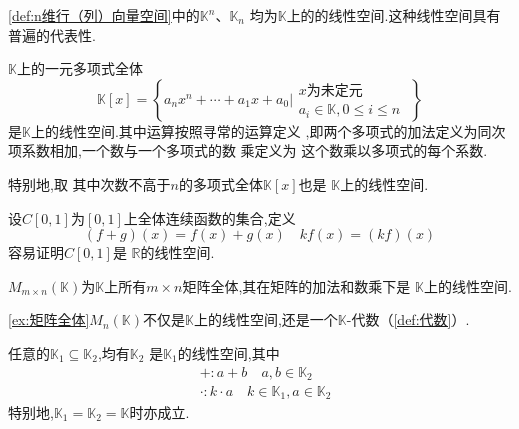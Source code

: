 \begin{brown}
\begin{example}
    \cref{def:n维行（列）向量空间}中的$\mathbb{K}^n$、$\mathbb{K}_n$
    均为$\mathbb{K}$上的的线性空间.这种线性空间具有普遍的代表性.
\end{example}
\end{brown}
\newpage
\begin{brown}
\begin{example}
    $\mathbb{K}$上的一元多项式全体
    \[
    \mathbb{K}\left[x\right]
    = \left\{a_nx^n+\cdots+
    a_1x+a_0\Bigg|\begin{matrix}
    x\text{为未定元}\qquad\quad\\
    a_i \in \mathbb{K},0\leqslant 
    i\leqslant n
    \end{matrix}\right\}
    \]
    是$\mathbb{K}$上的线性空间.其中运算按照寻常的运算定义
    ,即两个多项式的加法定义为同次项系数相加,一个数与一个多项式的数
    乘定义为
    这个数乘以多项式的每个系数.
    
    特别地,取
    其中次数不高于$n$的多项式全体$\mathbb{K}\left[x\right]$也是
    $\mathbb{K}$上的线性空间.
\end{example}
\end{brown}
\begin{brown}
\begin{example}
    设$C\left[0,1\right]$为$\left[0,1
    \right]$上全体连续函数的集合,定义
    \[
    \left(f+g\right)\left(x\right)=
    f\left(x\right)+g\left(x\right)
    \quad
    kf\left(x\right) = 
    \left(kf\right)\left(x\right)
    \]
    容易证明$C\left[0,1\right]$是
    $\mathbb{R}$的线性空间.
\end{example}
\end{brown}
\begin{brown}
\begin{example}\label{ex:矩阵全体}
    $M_{m \times n}\left(
        \mathbb{K}
    \right)$为$\mathbb{K}$上所有$m
    \times n$矩阵全体,其在矩阵的加法和数乘下是
    $\mathbb{K}$上的线性空间.
\end{example}
\end{brown}
\begin{red}
\begin{remark}
    \cref{ex:矩阵全体}$M_{n}\left(\mathbb{K}\right)$不仅是$\mathbb{K}$上的线性空间,还是一个$\mathbb{K}$-代数（\cref{def:代数}）.
\end{remark}
\end{red}
\begin{brown}
\begin{example}
    任意的$\mathbb{K}_1 \subseteq
    \mathbb{K}_2$,均有$\mathbb{K}_2$
    是$\mathbb{K}_1$的线性空间,其中
    \begin{align*}
        & + : a + b \quad a,b \in \mathbb{K}_2
        \\
        & \cdot : k \cdot a \quad 
        k \in \mathbb{K}_1,a \in 
        \mathbb{K}_2
    \end{align*}
    特别地,$\mathbb{K}_1
    =\mathbb{K}_2 =
    \mathbb{K}$时亦成立.
\end{example}
\end{brown}
